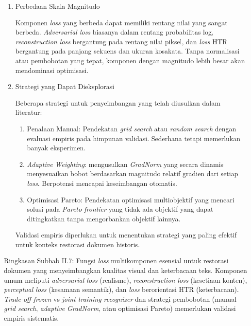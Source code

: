 \begin{enumerate}[leftmargin=*, labelindent=0pt, itemsep=1ex, topsep=0pt]

\item Perbedaan Skala Magnitudo
\label{para:perbedaan-skala-magnitudo}

Komponen \textit{loss} yang berbeda dapat memiliki rentang nilai yang sangat berbeda. \textit{Adversarial loss} biasanya dalam rentang probabilitas log, \textit{reconstruction loss} bergantung pada rentang nilai piksel, dan \textit{loss} HTR bergantung pada panjang sekuens dan ukuran kosakata. Tanpa normalisasi atau pembobotan yang tepat, komponen dengan magnitudo lebih besar akan mendominasi optimisasi.

\item Strategi yang Dapat Dieksplorasi
\label{para:strategi-pembobotan}

Beberapa strategi untuk penyeimbangan yang telah diusulkan dalam literatur:

\begin{enumerate}[leftmargin=1.5em, labelsep=0.5em, itemindent=0pt, label=\alph*., topsep=0pt, parsep=0pt, itemsep=0pt]
      \item Penalaan Manual: \mbox{} Pendekatan \textit{grid search} atau \textit{random search} dengan evaluasi empiris pada himpunan validasi. Sederhana tetapi memerlukan banyak eksperimen.

      \item \textit{Adaptive Weighting}: \mbox{} \parencite{chen2018gradnorm} mengusulkan \textit{GradNorm} yang secara dinamis menyesuaikan bobot berdasarkan magnitudo relatif gradien dari setiap \textit{loss}. Berpotensi mencapai keseimbangan otomatis.

      \item Optimisasi Pareto: \mbox{} Pendekatan optimisasi multiobjektif yang mencari solusi pada \textit{Pareto frontier} yang tidak ada objektif yang dapat ditingkatkan tanpa mengorbankan objektif lainnya.
\end{enumerate}

Validasi empiris diperlukan untuk menentukan strategi yang paling efektif untuk konteks restorasi dokumen historis.

\end{enumerate}

Ringkasan Subbab II.7: Fungsi \textit{loss} multikomponen esensial untuk restorasi dokumen yang menyeimbangkan kualitas visual dan keterbacaan teks. Komponen umum meliputi \textit{adversarial loss} (realisme), \textit{reconstruction loss} (kesetiaan konten), \textit{perceptual loss} (kesamaan semantik), dan \textit{loss} berorientasi HTR (keterbacaan). \textit{Trade-off frozen} vs \textit{joint training recognizer} dan strategi pembobotan (manual \textit{grid search}, \textit{adaptive} \textit{GradNorm}, atau optimisasi Pareto) memerlukan validasi empiris sistematis.


